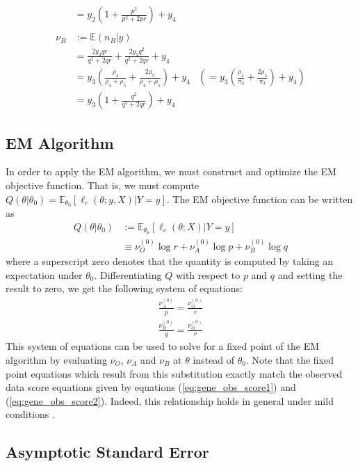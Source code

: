 \documentclass[11pt, oneside]{article}   	%
\newcommand{\bE}{\mathbb{E}}
\begin{document}
\begin{appendices}
\begin{align}
        &= y_2 \left( 1 + \frac{p^2}{p^2 + 2pr} \right) + y_4\\
        \nonumber \\
        \nu_B &:= \bE(n_B|y)\\
        &= \frac{2 y_3 qr}{q^2 + 2qr} + \frac{2y_3 q^2}{q^2 + 2qr} + y_4\\
        &= y_3 \left( \frac{\rho_4}{\rho_4 + \rho_5} + \frac{2\rho_5}{\rho_4 + \rho_5} \right) + y_4 &\left(= y_3 \left( \frac{\rho_4}{\pi_3} + \frac{2\rho_5}{\pi_3} \right) + y_4 \right)\\
        &= y_3 \left( 1 + \frac{q^2}{q^2 + 2qr} \right) + y_4
    \end{align}


    \subsection{EM Algorithm}
    \label{app:EM}

    In order to apply the EM algorithm, we must construct and optimize the EM objective function. That is, we must compute $Q(\theta|\theta_0) = \bE_{\theta_0} \left[ \ell_c(\theta; y, X) | Y=y \right]$. The EM objective function can be written as
    \begin{align}
		Q(\theta | \theta_0) &:= \bE_{\theta_0} [\ell_c (\theta; X) | Y=y]\\
		&\equiv \nu_O^{(0)} \log r + \nu_A^{(0)} \log p + \nu_B^{(0)} \log q
	\end{align}
    where a superscript zero denotes that the quantity is computed by taking an expectation under $\theta_0$. Differentiating $Q$ with respect to $p$ and $q$ and setting the result to zero, we get the following system of equations:
    \begin{align}
        \frac{\nu_A^{(0)}}{p} = \frac{\nu_O^{(0)}}{r} \label{eq:blood_update1}\\
        \frac{\nu_B^{(0)}}{q} = \frac{\nu_O^{(0)}}{r} \label{eq:blood_update2}
    \end{align}
    This system of equations can be used to solve for a fixed point of the EM algorithm by evaluating $\nu_O$, $\nu_A$ and $\nu_B$ at $\theta$ instead of $\theta_0$. Note that the fixed point equations which result from this substitution exactly match the observed data score equations given by equations (\ref{eq:gene_obs_score1}) and (\ref{eq:gene_obs_score2}). Indeed, this relationship holds in general under mild conditions \citep{Wu83}.

    \subsection{Asymptotic Standard Error}
    \label{app:ASE}


\end{appendices}
\end{document}
